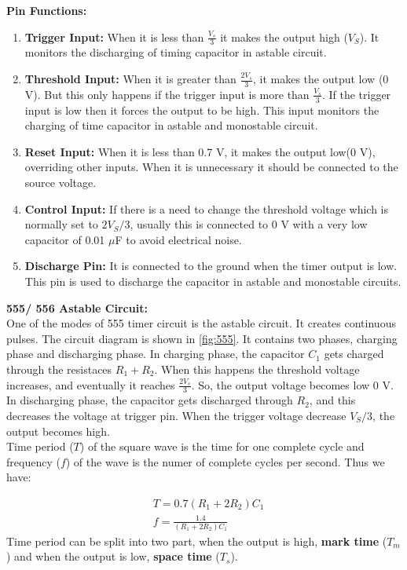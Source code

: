 \documentclass{scrartcl}
\begin{document}
\vspace{1em}\noindent\textbf{Pin Functions: }
\begin{enumerate}
	\item \textbf{Trigger Input:} When it is less than $\frac{V_s}{3}$ it makes the output high ($V_S$). It monitors the discharging of timing capacitor in astable circuit.
	\item \textbf{Threshold Input:} When it is greater than $\frac{2V_s}{3}$, it makes the output low (0 V). But this only happens if the trigger input is more than $\frac{V_s}{3}$. If the trigger input is low then it forces the output to be high. This input monitors the charging of time capacitor in astable and monostable circuit.
	\item \textbf{Reset Input:} When it is less than 0.7 V, it makes the output low(0 V), overriding other inputs. When it is unnecessary it should be connected to the source voltage.
	\item \textbf{Control Input:} If there is a need to change the threshold voltage which is normally set to $2 V_S/3$,	usually this is connected to 0 V with a very low capacitor of 0.01 $\mu$F to avoid electrical noise.
	\item \textbf{Discharge Pin: } It is connected to the ground when the timer output is low. This pin is used to discharge the capacitor in astable and monostable circuits.
\end{enumerate}
\newpage
\vspace{1em}\noindent
\textbf{555/ 556 Astable Circuit:}\\[0.3cm]
One of the modes of 555 timer circuit is the astable circuit. It creates continuous pulses. The circuit diagram is shown in \figurename{\ref{fig:555}}. It contains two phases, charging phase and discharging phase. In charging phase, the capacitor $C_1$ gets charged through the resistaces $R_1 + R_2$. When this happens the threshold voltage increases, and eventually it reaches $\frac{2V_s}{3}$. So, the output voltage becomes low 0 V. In discharging phase, the capacitor gets discharged through $R_2$, and this decreases the voltage at trigger pin. When the trigger voltage decrease $V_S/3$, the output becomes high.\\[0.3cm]
Time period ($T$) of the square wave is the time for one complete cycle and frequency ($f$) of the wave is the numer of complete cycles per second. Thus we have:

\begin{equation}
	\begin{split}
		&T = 0.7 (R_1 + 2 R_2) C_1 \\
		&f = \frac{1.4}{(R_1 + 2 R_2) C_1}
	\end{split}
\label{equation_1}
	\end{equation}
    \noindent
Time period can be split into two part, when the output is high, \textbf{mark time} ($T_m$) and when the output is low,  \textbf{space time} ($T_s$).
\end{document}
